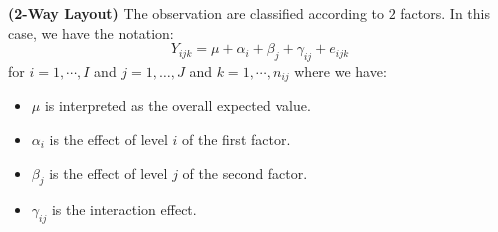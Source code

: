 \begin{definition}{\textbf{(2-Way Layout)}}
    The observation are classified according to $2$ factors. In this case, we have the notation:
    \begin{equation*}
        Y_{ijk} = \mu + \alpha_i + \beta_j + \gamma_{ij} + e_{ijk}
    \end{equation*}
    for $i=1,\cdots,I$ and $j=1,\dots,J$ and $k = 1,\cdots, n_{ij}$ where we have:
    \begin{itemize}
        \item $\mu$ is interpreted as the overall expected value. 
        \item $\alpha_i$ is the effect of level $i$ of the first factor.
        \item $\beta_j$ is the effect of level $j$ of the second factor. 
        \item $\gamma_{ij}$ is the interaction effect.
    \end{itemize}
\end{definition}

